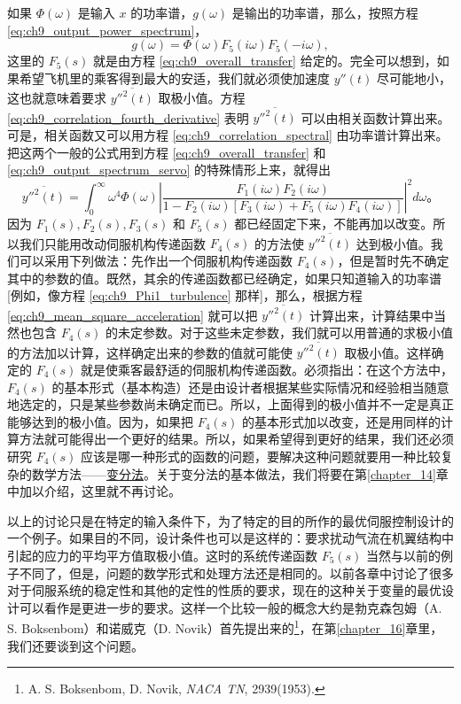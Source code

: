 如果 $ \Phi(\omega) $ 是输入 $ x $ 的功率谱，$ g(\omega) $ 是输出的功率谱，那么，按照方程 \eqref{eq:ch9_output_power_spectrum}，  
\begin{equation}\label{eq:ch9_output_spectrum_servo}
g(\omega) = \Phi(\omega)F_5(i\omega)F_5(-i\omega),
\end{equation}
这里的 $ F_5(s) $ 就是由方程 \eqref{eq:ch9_overall_transfer} 给定的。完全可以想到，如果希望飞机里的乘客得到最大的安适，我们就必须使加速度 $ y''(t) $ 尽可能地小，这也就意味着要求 $ \overline{y''^2(t)} $ 取极小值。方程 \eqref{eq:ch9_correlation_fourth_derivative} 表明 $ \overline{y''^2(t)} $ 可以由相关函数计算出来。可是，相关函数又可以用方程 \eqref{eq:ch9_correlation_spectral} 由功率谱计算出来。把这两个一般的公式用到方程 \eqref{eq:ch9_overall_transfer} 和 \eqref{eq:ch9_output_spectrum_servo} 的特殊情形上来，就得出  
\begin{equation}\label{eq:ch9_mean_square_acceleration}
\overline{y''^2(t)} = \int_{0}^{\infty} \omega^4 \Phi(\omega) \left| \frac{F_1(i\omega)F_2(i\omega)}{1 - F_2(i\omega)[F_3(i\omega) + F_5(i\omega)F_4(i\omega)]} \right|^2 d\omega。
\end{equation}
因为 $ F_1(s), F_2(s), F_3(s) $ 和 $ F_5(s) $ 都已经固定下来，不能再加以改变。所以我们只能用改动伺服机构传递函数 $ F_4(s) $ 的方法使 $ \overline{y''^2(t)} $ 达到极小值。我们可以采用下列做法：先作出一个伺服机构传递函数 $ F_4(s) $，但是暂时先不确定其中的参数的值。既然，其余的传递函数都已经确定，如果只知道输入的功率谱[例如，像方程 \eqref{eq:ch9_Phi1_turbulence} 那样]，那么，根据方程 \eqref{eq:ch9_mean_square_acceleration} 就可以把 $ \overline{y''^2(t)} $ 计算出来，计算结果中当然也包含 $F_4(s)$ 的未定参数。对于这些未定参数，我们就可以用普通的求极小值的方法加以计算，这样确定出来的参数的值就可能使 $ \overline{y''^2(t)} $ 取极小值。这样确定的 $F_4(s)$ 就是使乘客最舒适的伺服机构传递函数。必须指出：在这个方法中，$F_4(s)$ 的基本形式（基本构造）还是由设计者根据某些实际情况和经验相当随意地选定的，只是某些参数尚未确定而已。所以，上面得到的极小值并不一定是真正能够达到的极小值。因为，如果把 $F_4(s)$ 的基本形式加以改变，还是用同样的计算方法就可能得出一个更好的结果。所以，如果希望得到更好的结果，我们还必须研究 $F_4(s)$ 应该是哪一种形式的函数的问题，要解决这种问题就要用一种比较复杂的数学方法——\underline{变分法}。关于变分法的基本做法，我们将要在第\ref{chapter_14}章中加以介绍，这里就不再讨论。

以上的讨论只是在特定的输入条件下，为了特定的目的所作的最优伺服控制设计的一个例子。如果目的不同，设计条件也可以是这样的：要求扰动气流在机翼结构中引起的应力的平均平方值取极小值。这时的系统传递函数 $ F_5(s) $ 当然与以前的例子不同了，但是，问题的数学形式和处理方法还是相同的。以前各章中讨论了很多对于伺服系统的稳定性和其他的定性的性质的要求，现在的这种关于变量的最优设计可以看作是更进一步的要求。这样一个比较一般的概念大约是勃克森包姆（A. S. Boksenbom）和诺威克（D. Novik）首先提出来的\footnote{A. S. Boksenbom, D. Novik, \emph{NACA TN}, 2939(1953).}，在第\ref{chapter_16}章里，我们还要谈到这个问题。

